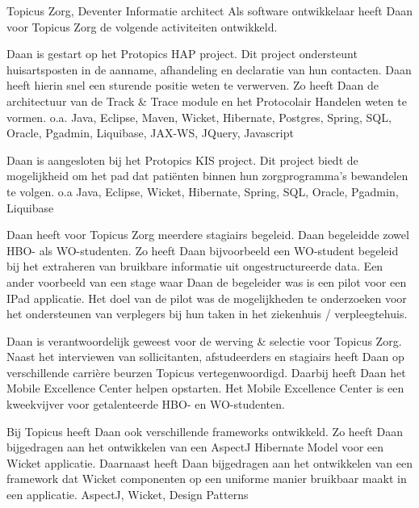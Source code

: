 	\begin{workExperience}{Topicus Zorg, Deventer}%
	{Informatie architect}{}
		Als software ontwikkelaar heeft Daan voor Topicus Zorg de volgende
		activiteiten ontwikkeld.

		Daan is gestart op het Protopics HAP project. Dit project ondersteunt
		huisartsposten in de aanname, afhandeling en declaratie van hun
		contacten. Daan heeft hierin snel een sturende positie weten te
		verwerven. Zo heeft Daan de architectuur van de Track \& Trace module en
		het Protocolair Handelen weten te vormen.
		\technics o.a. Java, Eclipse, Maven, Wicket, Hibernate, Postgres,
		Spring, SQL, Oracle, Pgadmin, Liquibase, JAX-WS, JQuery, Javascript

		Daan is aangesloten bij het Protopics KIS project. Dit project biedt
		de mogelijkheid om het pad dat pati\"enten binnen hun zorgprogramma's
		bewandelen te volgen.
		\technics o.a Java, Eclipse, Wicket, Hibernate, Spring, SQL, Oracle,
		Pgadmin, Liquibase

		Daan heeft voor Topicus Zorg meerdere stagiairs begeleid.
		Daan begeleidde zowel HBO- als WO-studenten. Zo heeft Daan bijvoorbeeld
		een WO-student begeleid bij het extraheren van bruikbare informatie uit
		ongestructureerde data. Een ander voorbeeld van een stage waar Daan de
		begeleider was is een pilot voor een IPad applicatie. Het doel van de
		pilot was de mogelijkheden te onderzoeken voor het ondersteunen van
		verplegers bij hun taken in het ziekenhuis / verpleegtehuis.

		Daan is verantwoordelijk geweest voor de werving \& selectie voor
		Topicus Zorg. Naast het interviewen van sollicitanten, afstudeerders en
		stagiairs heeft Daan op verschillende carri\`ere beurzen Topicus
		vertegenwoordigd.
		Daarbij heeft Daan het Mobile Excellence Center helpen opstarten. Het
		Mobile Excellence Center is een kweekvijver voor getalenteerde HBO- en
		WO-studenten.

		Bij Topicus heeft Daan ook verschillende frameworks ontwikkeld. Zo
		heeft Daan bijgedragen aan het ontwikkelen van een AspectJ Hibernate
		Model voor een Wicket applicatie. Daarnaast heeft Daan bijgedragen aan
		het ontwikkelen van een framework dat Wicket componenten op een uniforme
		manier bruikbaar maakt in een applicatie.
		\technics AspectJ, Wicket, Design Patterns
	\end{workExperience}


